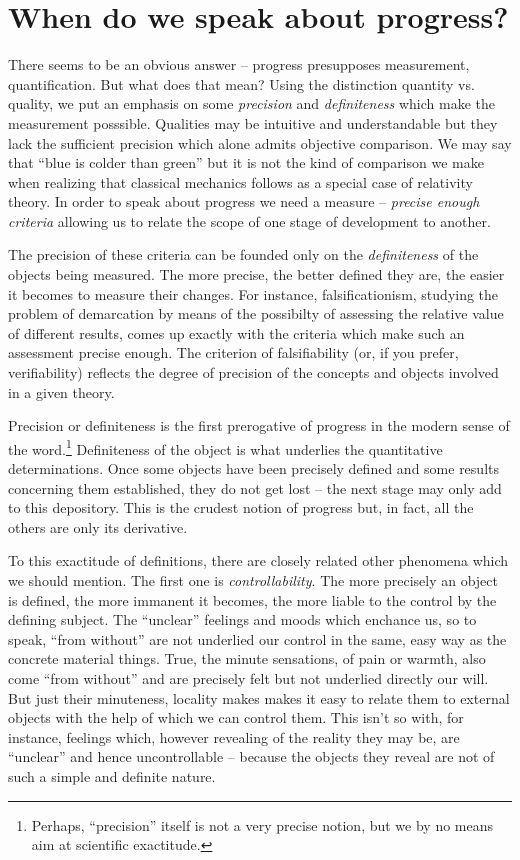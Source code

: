 \section{When do we speak about progress?}
There seems to be an obvious answer -- progress presupposes measurement,
quantification. But what does that mean? Using the distinction quantity vs.
quality, we put an emphasis on some {\em precision} and {\em definiteness} 
which make the measurement posssible.
Qualities may be intuitive and understandable but they lack the sufficient
precision which alone admits objective comparison. We may say that ``blue is
colder than green'' but it is not the kind of comparison we make when realizing
that classical mechanics follows as a special case of relativity theory. In 
order to speak about progress we need a measure -- {\em precise enough 
criteria} allowing us to relate the scope of one stage of development to 
another.

The precision of these criteria can be founded only on the {\em definiteness}
of the objects being measured. The more precise, the better defined they are,
the easier it becomes to measure their changes. For instance, falsificationism,
studying the problem of demarcation by means of the possibilty of assessing
the relative value of different results, comes up exactly with the criteria
which make such an assessment precise enough. The criterion of falsifiability
(or, if you prefer, verifiability) reflects the degree of precision of the 
concepts and objects involved in a given theory. 

Precision or definiteness is
the first prerogative of progress in the modern sense of the word.\footnote{
Perhaps, ``precision'' itself is not a very precise notion, but we by no means
 aim at scientific exactitude.}
Definiteness of the object is what underlies the quantitative determinations.
Once some objects have been precisely defined and some results concerning
them established, they do not get lost -- the next stage may only add to this
depository. This is the crudest notion of progress but, in fact, all the 
others are only its derivative.

To this exactitude of definitions, there are closely related other phenomena
which we should mention. The first one is {\em controllability}. The more
precisely an object is defined, the more immanent it becomes, the more liable
to the control by the defining subject. The ``unclear'' feelings and moods
which enchance us, so to speak, ``from without'' are not underlied our control
in the same, easy way as the concrete material things. True, the minute
sensations, of pain or warmth, also come ``from without'' and are precisely
felt but not underlied directly our will. But just their minuteness, locality
makes makes it easy to relate them to external objects with the help of which
we can control them. This isn't so with, for instance, feelings which,
however revealing of the reality they may be, are ``unclear'' and hence 
uncontrollable -- because the objects they reveal are not of such a simple
and definite nature.

